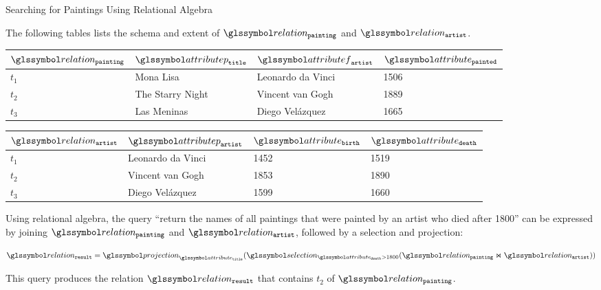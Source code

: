 \begin{example}[label=example:rel_alg_query]{Searching for Paintings Using Relational Algebra}{}

    The following tables lists the schema and extent of $\relation_{\mathtt{painting}}$ and $\relation_{\mathtt{artist}}$.

    \begin{center}
        \begin{tabular}{ l || l | l | l |}
            $\relation_{\mathtt{painting}}$ & $\attributep_{\mathtt{title}}$  & $\attributef_{\mathtt{artist}}$  & $\attribute_{\mathtt{painted}}$ \\ 
            \hline
            \hline
            $t_1$ & Mona Lisa &  Leonardo da Vinci & 1506 \\
            \hline
            $t_2$ & The Starry Night & Vincent van Gogh & 1889 \\
            \hline
            $t_3$ & Las Meninas & Diego Velázquez & 1665 \\
            \hline
        \end{tabular}
    \end{center}

    \begin{center}
        \begin{tabular}{ l || l | l | l |}
            $\relation_{\mathtt{artist}}$ & $\attributep_{\mathtt{artist}}$ & $\attribute_{\mathtt{birth}}$ & $\attribute_{\mathtt{death}}$\\ 
            \hline
            \hline
            $t_1$ & Leonardo da Vinci & 1452 & 1519 \\
            \hline
            $t_2$ & Vincent van Gogh & 1853 & 1890 \\
            \hline
            $t_3$ & Diego Velázquez & 1599 & 1660 \\
            \hline
        \end{tabular}
    \end{center}

    Using relational algebra, the query ``return the names of all paintings that were painted by an artist who died after 1800'' can be expressed by joining $\relation_{\mathtt{painting}}$ and $\relation_{\mathtt{artist}}$, followed by a selection and projection:

    \begin{equation*}
        \relation_{\mathtt{result}} = \projection_{\attribute_{\mathtt{title}}} (\selection_{\attribute_{\mathtt{death}} > 1800}(\relation_{\mathtt{painting}} \Join \relation_{\mathtt{artist}}))
    \end{equation*}

 This query produces the relation $\relation_{\mathtt{result}}$ that contains $t_2$ of $\relation_{\mathtt{painting}}$.
\end{example}


